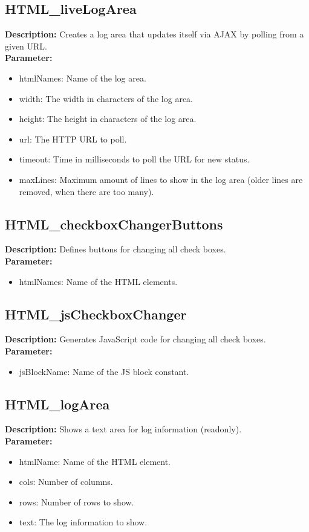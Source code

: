 \subsection{HTML\_liveLogArea}
\textbf{Description:} Creates a log area that updates itself via AJAX by polling from a given URL.\\
\textbf{Parameter:}
\begin{itemize}
\item htmlNames: Name of the log area.
\item width: The width in characters of the log area.
\item height: The height in characters of the log area.
\item url: The HTTP URL to poll.
\item timeout: Time in milliseconds to poll the URL for new status.
\item maxLines: Maximum amount of lines to show in the log area (older lines are removed, when there are too many).
\end{itemize}

\subsection{HTML\_checkboxChangerButtons}
\textbf{Description:} Defines buttons for changing all check boxes.\\
\textbf{Parameter:}
\begin{itemize}
\item htmlNames: Name of the HTML elements.
\end{itemize}

\subsection{HTML\_jsCheckboxChanger}
\textbf{Description:} Generates JavaScript code for changing all check boxes.\\
\textbf{Parameter:}
\begin{itemize}
\item jsBlockName: Name of the JS block constant.
\end{itemize}

\subsection{HTML\_logArea}
\textbf{Description:} Shows a text area for log information (readonly).\\
\textbf{Parameter:}
\begin{itemize}
\item htmlName: Name of the HTML element.
\item cols: Number of columns.
\item rows: Number of rows to show.
\item text: The log information to show.
\end{itemize}

